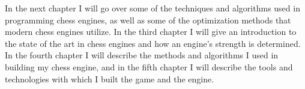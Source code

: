 In the next chapter I will go over some of the techniques and algorithms used in programming chess engines, as well as some of the optimization methods that modern chess engines utilize. In the third chapter I will give an introduction to the state of the art in chess engines and how an engine's strength is determined. In the fourth chapter I will describe the methods and algorithms I used in building my chess engine, and in the fifth chapter I will describe the tools and technologies with which I built the game and the engine.
